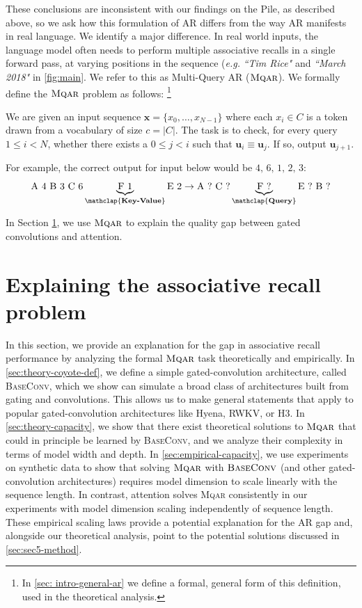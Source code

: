 These conclusions are inconsistent with our findings on the Pile, as described above, so we ask how this formulation of AR differs from the way AR manifests in real language. We identify a major difference. In real world inputs, the language model often needs to perform multiple associative recalls in a single forward pass, at varying positions in the sequence (\textit{e.g.} \textit{``Tim Rice"} and \textit{``March 2018"} in \ref{fig:main}. We refer to this as Multi-Query AR ({$\textsc{Mqar}$}).
\label{sec:theory-ar-def}
We formally define the {$\textsc{Mqar}$} problem as follows: \footnote{In \ref{sec: intro-general-ar} we define a formal, general form of this definition, used in the theoretical analysis.}

\begin{definition} 
    \label{def: general-AR} We are given an input sequence 
    $\bm{x} = \{x_0, \ldots, x_{N-1}\}$ where each $x_i \in C$ is a token drawn from a vocabulary of size $c = |C|$. The task is to check, for every query
    $1\le i<N$, whether there exists a $0 \le j < i$ such that $\bm{u}_i \equiv \bm{u}_j$. If so, output $\bm{u}_{j+1}$. 
\end{definition}

For example, the correct output for input below would be $\text{4, 6, 1, 2, 3}$: $$
\text{A 4 B 3 C 6}\underbrace{\text{F 1}}_{\mathclap{\textbf{Key-Value}}}  \text{E 2} \rightarrow \text{A ? C ?} \underbrace{\text{F ?}}_{\mathclap{\textbf{Query}}} \text{E ? B ?} $$

In Section \ref{sec:theory-explanation}, we use {$\textsc{Mqar}$} to explain the quality gap between gated convolutions and attention. 

\section{Explaining the associative recall problem}

\label{sec:theory-explanation}
In this section, we provide an explanation for the gap in associative recall performance by analyzing the formal ${\textsc{Mqar}}$ task theoretically and empirically. In \ref{sec:theory-coyote-def}, we define a simple gated-convolution architecture, called \textsc{BaseConv}, which we show can simulate a broad class of architectures built from gating and convolutions. This allows us to make general statements that apply to popular gated-convolution architectures like Hyena, RWKV, or H3. In \ref{sec:theory-capacity}, we show that there exist theoretical solutions to {$\textsc{Mqar}$} that could in principle be learned by \textsc{BaseConv}, and we analyze their complexity in terms of model width and depth. In \ref{sec:empirical-capacity}, we use experiments on synthetic data to show that solving ${\textsc{Mqar}}$ with ${\textsc{BaseConv}}$ (and other gated-convolution architectures) requires model dimension to scale linearly with the sequence length. In contrast, attention solves {\textsc{Mqar}} consistently in our experiments with model dimension scaling independently of sequence length. These empirical scaling laws provide a potential explanation for the AR gap and, alongside our theoretical analysis, point to the potential solutions discussed in \ref{sec:sec5-method}.


